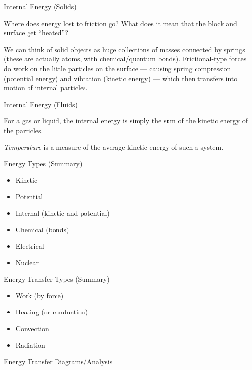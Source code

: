 \documentclass[12pt]{beamer}
\begin{document}
\begin{frame}{Internal Energy (Solids)}

Where does energy lost to friction go?  What does it mean that the block and surface get ``heated''?

\vspace{0.25cm}

We can think of solid objects as huge collections of masses connected by springs (these are actually atoms, with chemical/quantum bonds).  Frictional-type forces do work on the little particles on the surface --- causing spring compression (potential energy) and vibration (kinetic energy) --- which then transfers into motion of internal particles.

\vspace{6cm}

\end{frame}
\begin{frame}{Internal Energy (Fluids)}

For a gas or liquid, the internal energy is simply the sum of the kinetic energy of the particles.



\vspace{6cm}

{\em Temperature} is a measure of the average kinetic energy of such a system.  

\end{frame}
\begin{frame}{Energy Types (Summary)}

\begin{itemize}
\item Kinetic
\item Potential
\item Internal (kinetic and potential)
\item Chemical (bonds)
\item Electrical 
\item Nuclear
\end{itemize}

\end{frame}
\begin{frame}{Energy Transfer Types (Summary)}

\begin{itemize}
\item Work (by force)
\item Heating (or conduction)
\item Convection 
\item Radiation
\end{itemize}

\end{frame}
\begin{frame}{Energy Transfer Diagrams/Analysis}


\end{frame}
\end{document}
